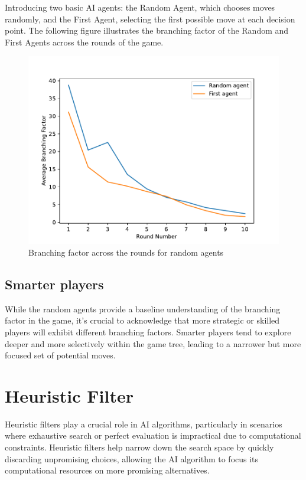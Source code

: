 Introducing two basic AI agents: the Random Agent, which chooses moves randomly, and the First Agent, selecting the first possible move at each decision point.
The following figure illustrates the branching factor of the Random and First Agents across the rounds of the game.


\begin{figure}[H]
    \caption{ Branching factor across the rounds for random agents}
    \centerline{\mbox{\includegraphics[width=150mm]{img/random_agents_branching_factor.pdf}}}
    \label{fig:example}
\end{figure}


\subsection{Smarter players} \label{subsec:smarter_player_branching_factor}
While the random agents provide a baseline understanding of the branching factor in the game, it's crucial to acknowledge that more strategic or skilled players 
will exhibit different branching factors. Smarter players tend to explore deeper and more selectively within the game tree, leading to a narrower but more focused 
set of potential moves. 


\section{Heuristic Filter} \label{sec:Heuristic_filter}

Heuristic filters play a crucial role in AI algorithms, particularly in scenarios where exhaustive search or perfect evaluation is impractical due to 
computational constraints. Heuristic filters help narrow down the search space by quickly discarding unpromising choices, allowing the AI algorithm to 
focus its computational resources on more promising alternatives. 


